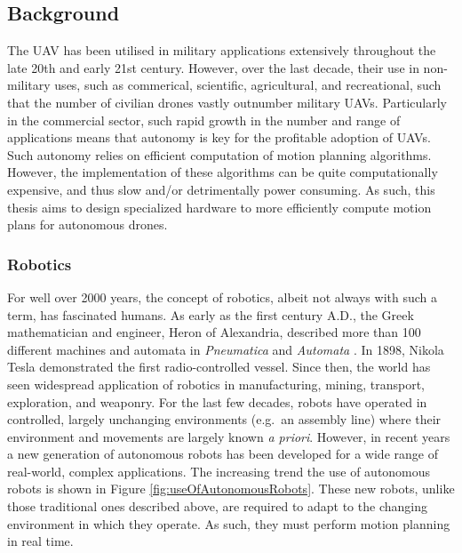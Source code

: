 
\subsection{Background}
    
    The \ac{UAV} has been utilised in military applications extensively throughout the late 20th and early 21st century. However, over the last decade, their use in non-military uses, such as commerical, scientific, agricultural, and recreational, such that the number of civilian drones vastly outnumber military \ac{UAV}s. Particularly in the commercial sector, such rapid growth in the number and range of applications means that autonomy is key for the profitable adoption of \ac{UAV}s. Such autonomy relies on efficient computation of motion planning algorithms. However, the implementation of these algorithms can be quite computationally expensive, and thus slow and/or detrimentally power consuming. As such, this thesis aims to design specialized hardware to more efficiently compute motion plans for autonomous drones.

    \subsubsection*{Robotics}
        For well over 2000 years, the concept of robotics, albeit not always with such a term, has fascinated humans. As early as the first century A.D., the Greek mathematician and engineer, Heron of Alexandria, described more than 100 different machines and automata in \textit{Pneumatica} and \textit{Automata} \cite{Alexandrinus}. In 1898, Nikola Tesla demonstrated the first radio-controlled vessel. Since then, the world has seen widespread application of robotics in manufacturing, mining, transport, exploration, and weaponry. For the last few decades, robots have operated in controlled, largely unchanging environments (e.g.\ an assembly line) where their environment and movements are largely known \textit{a priori}.
        \newline
        However, in recent years a new generation of autonomous robots has been developed for a wide range of real-world, complex applications. The increasing trend the use of autonomous robots is shown in Figure \ref{fig:useOfAutonomousRobots}. These new robots, unlike those traditional ones described above, are required to adapt to the changing environment in which they operate. As such, they must perform motion planning in real time.

